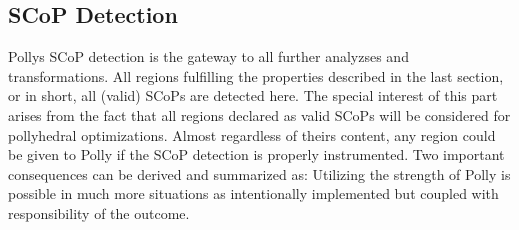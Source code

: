 


\subsection{SCoP Detection}
Pollys SCoP detection is the gateway to all further analyzses and 
transformations. All regions fulfilling the properties described in the 
last section, or in short, all (valid) SCoPs are detected here. 
The special interest of this part arises from the fact that all 
regions declared as valid SCoPs will be considered for pollyhedral 
optimizations. Almost regardless of theirs content, any region could be given to
Polly if the SCoP detection is properly instrumented. Two important consequences
can be derived and summarized as:
Utilizing the strength of Polly is possible in much more situations as 
intentionally implemented but coupled with responsibility of the outcome.

